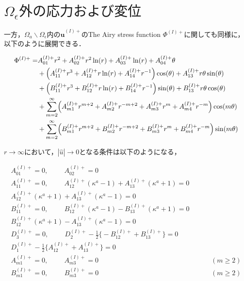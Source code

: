 \section{$\Omega_{\epsilon}外の応力および変位$}

一方，$\Omega_{a}\backslash\Omega_\epsilon$内の$\hat{\bm{u}}^{(I)+}$のThe Airy stress function $\Phi^{(I)+}$に関しても同様に，以下のように展開できる．

\begin{align}
\Phi^{(I)+} =&A_{01}^{(I)+}r^2+A_{02}^{(I)+}r^2\ln(r)+A_{03}^{(I)+}\ln(r)+A_{04}^{(I)+}\theta
\nonumber
\\
&+\Bigl(A_{11}^{(I)+}r^3+A_{12}^{(I)+}r\ln(r)+A_{14}^{(I)+}r^{-1}\Bigr)\cos(\theta)+A_{13}^{(I)+}r\theta \sin(\theta)
\nonumber
\\
&+\Bigl(B_{11}^{(I)+}r^3+B_{12}^{(I)+}r\ln(r)+B_{14}^{(I)+}r^{-1}\Bigr)\sin(\theta)+B_{13}^{(I)+}r\theta \cos(\theta)
\nonumber
\\
&+\sum_{m=2}^{\infty}\Bigl(A_{m1}^{(I)+}r^{m+2}+A_{m2}^{(I)+}r^{-m+2}
+A_{m3}^{(I)+}r^{m}+A_{m4}^{(I)+}r^{-m}\Bigr)\cos(m\theta)
\nonumber
\\
&+\sum_{m=2}^{\infty}\Bigl(B_{m1}^{(I)+}r^{m+2}+B_{m2}^{(I)+}r^{-m+2}
+B_{m3}^{(I)+}r^{m}+B_{m4}^{(I)+}r^{-m}\Bigr)\sin(m\theta)
\label{eq:Airy1out}
\end{align}


$r\rightarrow\infty$において，$|\hat{u}|\rightarrow0$となる条件は以下のようになる，

\begin{align}
A_{01}^{(I)+}=0,\hspace{1cm}A_{02}^{(I)+}=0&
\nonumber
\\
A_{11}^{(I)+}=0,\hspace{1cm}A_{12}^{(I)+}(\kappa^{a}-1)+A_{13}^{(I)+}(\kappa^{a}+1)=0&
\nonumber
\\
A_{12}^{(I)+}(\kappa^{a}+1)+A_{13}^{(I)+}(\kappa^{a}-1)=0
\nonumber
\\
B_{11}^{(I)+}=0,\hspace{1cm}B_{12}^{(I)+}(\kappa^{a}-1)-B_{13}^{(I)+}(\kappa^{a}+1)=0&
\nonumber
\\
B_{12}^{(I)+}(\kappa^{a}+1)-A_{13}^{(I)+}(\kappa^{a}-1)=0
\nonumber
\\
D_{3}^{(I)+}=0,\hspace{1cm}
D_{2}^{(I)+}-\frac{1}{2}\bigl\{-B_{12}^{(I)+}+B_{13}^{(I)+}\bigr\}=0&
\nonumber
\\
D_{1}^{(I)+}-\frac{1}{2}\bigl\{A_{12}^{(I)+}+A_{13}^{(I)+}\bigr\}=0&
\nonumber
\\
A_{m1}^{(I)+}=0,\hspace{1cm}A_{m3}^{(I)+}=0&\hspace{1cm}(m\geq2)
\nonumber
\\
B_{m1}^{(I)+}=0,\hspace{1cm}B_{m3}^{(I)+}=0&\hspace{1cm}(m\geq2)
\label{eq:condition1out}
\end{align}


